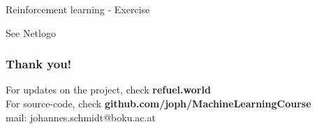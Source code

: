 \documentclass[color=usenames,dvipsnames]{beamer}
\begin{document}
\begin{frame}{Reinforcement learning - Exercise} 

See Netlogo

\end{frame}






{


\begin{frame}
\frametitle{Thank you!}
\begin{block}{
 For updates on the project, check \textbf{refuel.world}\\
 For source-code, check \textbf{github.com/joph/MachineLearningCourse}\\
 
		mail: johannes.schmidt@boku.ac.at\\

}
\end{block}

\vspace{2.5 cm}


\end{frame}

}
\end{document}
